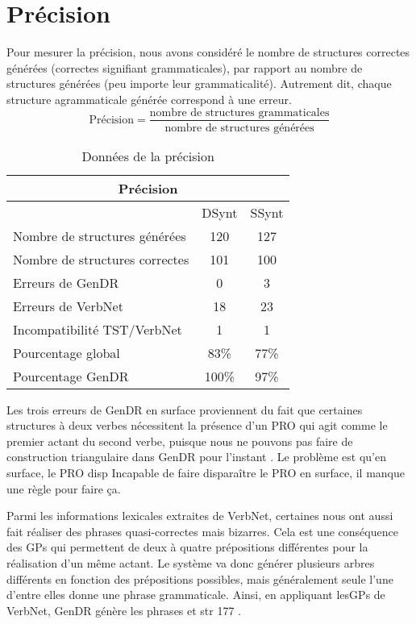 \section{Précision}
Pour mesurer la précision, nous avons considéré le nombre de structures correctes générées (correctes signifiant grammaticales), par rapport au nombre de structures générées (peu importe leur grammaticalité). Autrement dit, chaque structure agrammaticale générée correspond à une erreur.
\[\text{Précision} = \frac{\text{nombre de structures grammaticales}}{\text{nombre de structures générées}}\]

\begin{table}
\caption{Données de la précision}
\begin{tabular}{ |p{6cm}||c|c|  }
 \hline
 \multicolumn{3}{|c|}{Précision} \\
 \hline
  & DSynt & SSynt\\
 \hline
 Nombre de structures générées   & 120  &127  \\
 Nombre de structures correctes &  101  & 100   \\
 Erreurs de GenDR & 0 & 3\\
 Erreurs de VerbNet    & 18 & 23\\
 Incompatibilité TST/VerbNet & 1 & 1\\
 Pourcentage global & 83\%  & 77\% \\
 Pourcentage GenDR & 100\%  & 97\% \\
 \hline
\end{tabular}
\end{table}

Les trois erreurs de GenDR en surface proviennent du fait que certaines structures à deux verbes nécessitent la présence d'un PRO qui agit comme le premier actant du second verbe, puisque nous ne pouvons pas faire de construction triangulaire dans GenDR pour l'instant . Le problème est qu'en surface, le PRO disp Incapable de faire disparaître le PRO en surface, il manque une règle pour faire ça.

Parmi les informations lexicales extraites de VerbNet, certaines nous ont aussi fait réaliser des phrases quasi-correctes mais bizarres. Cela est une conséquence des \acp{GP} qui permettent de deux à quatre prépositions différentes pour la réalisation d'un même actant. Le système va donc générer plusieurs arbres différents en fonction des prépositions possibles, mais généralement seule l'une d'entre elles donne une phrase grammaticale. Ainsi, en appliquant les\acp{GP} de VerbNet, GenDR génère les phrases  et \ungr{} str 177 .

